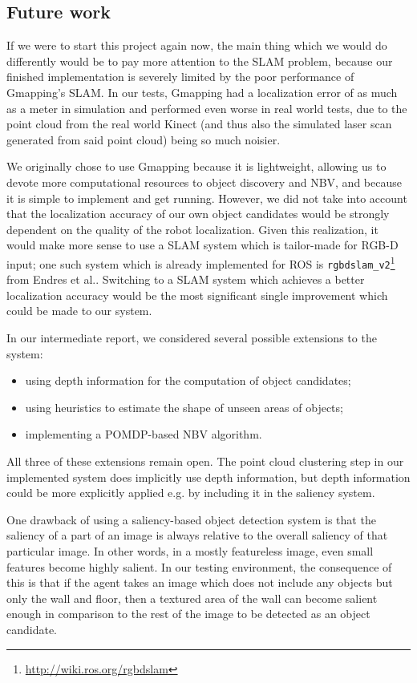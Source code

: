 \subsection{Future work}

If we were to start this project again now, the main thing which we would do differently would be to pay more attention to the SLAM problem, because our finished implementation is severely limited by the poor performance of Gmapping's SLAM.
In our tests, Gmapping had a localization error of as much as a meter in simulation and performed even worse in real world tests, due to the point cloud from the real world Kinect (and thus also the simulated laser scan generated from said point cloud) being so much noisier.

We originally chose to use Gmapping because it is lightweight, allowing us to devote more computational resources to object discovery and NBV, and because it is simple to implement and get running.
However, we did not take into account that the localization accuracy of our own object candidates would be strongly dependent on the quality of the robot localization.
Given this realization, it would make more sense to use a SLAM system which is tailor-made for RGB-D input; one such system which is already implemented for ROS is \texttt{rgbdslam\_v2}\footnote{\url{http://wiki.ros.org/rgbdslam}} from Endres et al.\cite{endres2014rgbdslam}.
Switching to a SLAM system which achieves a better localization accuracy would be the most significant single improvement which could be made to our system.

In our intermediate report, we considered several possible extensions to the system:
\begin{itemize}
	\setlength\itemsep{1pt}
	\item using depth information for the computation of object candidates;
	\item using heuristics to estimate the shape of unseen areas of objects;
	\item implementing a POMDP-based NBV algorithm.
\end{itemize}

All three of these extensions remain open.
The point cloud clustering step in our implemented system does implicitly use depth information, but depth information could be more explicitly applied e.g. by including it in the saliency system.

One drawback of using a saliency-based object detection system is that the saliency of a part of an image is always relative to the overall saliency of that particular image.
In other words, in a mostly featureless image, even small features become highly salient.
In our testing environment, the consequence of this is that if the agent takes an image which does not include any objects but only the wall and floor, then a textured area of the wall can become salient enough in comparison to the rest of the image to be detected as an object candidate.

